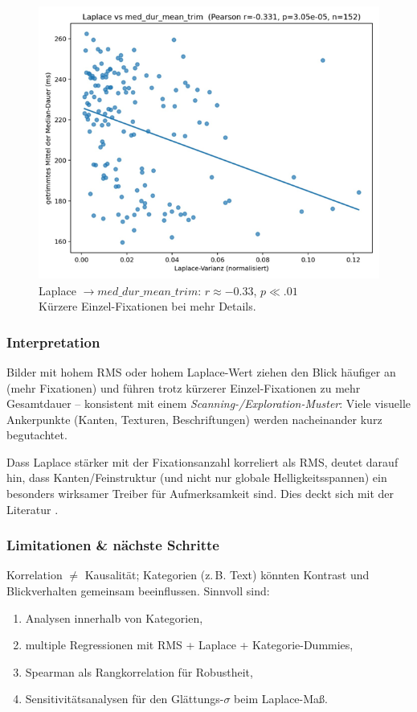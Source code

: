 \documentclass[
    language=german, %
    thesis=seminar, %
    supervisor=postdoc, %
    multiauthor=true, %
    ]{settings/csssa-thesis}
\begin{document}
\begin{figure}[h]
    \centering
    \includegraphics[width=\linewidth,height=0.8\textheight,keepaspectratio]{figures/Bild9.png}
    \caption{Laplace $\rightarrow med\_dur\_mean\_trim$: $r \approx -0.33$, $p \ll .01$ \\
          Kürzere Einzel-Fixationen bei mehr Details.  }\label{fig:bild9}
\end{figure}

\subsubsection{Interpretation}
Bilder mit hohem RMS oder hohem Laplace-Wert ziehen den Blick häufiger an (mehr Fixationen) und führen trotz kürzerer Einzel-Fixationen zu mehr Gesamtdauer – konsistent mit einem \textit{Scanning-/Exploration-Muster}: Viele visuelle Ankerpunkte (Kanten, Texturen, Beschriftungen) werden nacheinander kurz begutachtet. 

Dass Laplace stärker mit der Fixationsanzahl korreliert als RMS, deutet darauf hin, dass Kanten/Feinstruktur (und nicht nur globale Helligkeitsspannen) ein besonders wirksamer Treiber für Aufmerksamkeit sind. Dies deckt sich mit der Literatur \cite{SaliencyPrediction_JoV}.

\subsubsection{Limitationen \& nächste Schritte}
Korrelation $\neq$ Kausalität; Kategorien (z.\,B. Text) könnten Kontrast und Blickverhalten gemeinsam beeinflussen. Sinnvoll sind: 
\begin{enumerate}[label=(\alph*)]
    \item Analysen innerhalb von Kategorien, 
    \item multiple Regressionen mit RMS + Laplace + Kategorie-Dummies, 
    \item Spearman als Rangkorrelation für Robustheit, 
    \item Sensitivitätsanalysen für den Glättungs-$\sigma$ beim Laplace-Maß. 
\end{enumerate}
\end{document}
